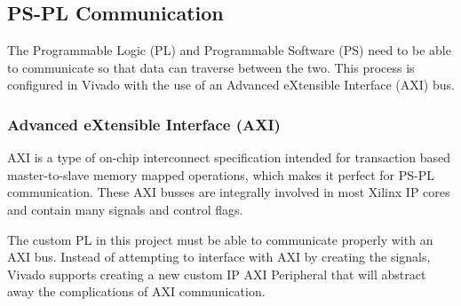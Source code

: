 \subsection{PS-PL Communication} \label{ssec:ps_pl}
The Programmable Logic (PL) and Programmable Software (PS) need to be able to communicate so that data can traverse between the two. This process is configured in Vivado with the use of an Advanced eXtensible Interface (AXI) bus.

\subsubsection{Advanced eXtensible Interface (AXI)}
AXI is a type of on-chip interconnect specification intended for transaction based master-to-slave memory mapped operations, which makes it perfect for PS-PL communication. These AXI busses are integrally involved in most Xilinx IP cores and contain many signals and control flags.
\par
The custom PL in this project must be able to communicate properly with an AXI bus. Instead of attempting to interface with AXI by creating the signals, Vivado supports creating a new custom IP AXI Peripheral that will abstract away the complications of AXI communication.

